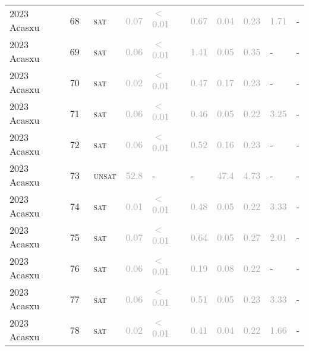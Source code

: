 \begin{center}
{\begin{longtable}{@{}llllllllll@{}}
2023 Acasxu & 68 & ~\textsc{sat} & \textcolor{darkgray}{0.07} & \textcolor{darkgray}{$<$0.01} & \textcolor{darkgray}{0.67} & \textcolor{darkgray}{0.04} & \textcolor{darkgray}{0.23} & \textcolor{darkgray}{1.71} & - \\
2023 Acasxu & 69 & ~\textsc{sat} & \textcolor{darkgray}{0.06} & \textcolor{darkgray}{$<$0.01} & \textcolor{darkgray}{1.41} & \textcolor{darkgray}{0.05} & \textcolor{darkgray}{0.35} & - & - \\
2023 Acasxu & 70 & ~\textsc{sat} & \textcolor{darkgray}{0.02} & \textcolor{darkgray}{$<$0.01} & \textcolor{darkgray}{0.47} & \textcolor{darkgray}{0.17} & \textcolor{darkgray}{0.23} & - & - \\
2023 Acasxu & 71 & ~\textsc{sat} & \textcolor{darkgray}{0.06} & \textcolor{darkgray}{$<$0.01} & \textcolor{darkgray}{0.46} & \textcolor{darkgray}{0.05} & \textcolor{darkgray}{0.22} & \textcolor{darkgray}{3.25} & - \\
2023 Acasxu & 72 & ~\textsc{sat} & \textcolor{darkgray}{0.06} & \textcolor{darkgray}{$<$0.01} & \textcolor{darkgray}{0.52} & \textcolor{darkgray}{0.16} & \textcolor{darkgray}{0.23} & - & - \\
2023 Acasxu & 73 & ~\textsc{unsat} & \textcolor{darkgray}{52.8} & - & - & \textcolor{darkgray}{47.4} & \textcolor{darkgray}{4.73} & - & - \\
2023 Acasxu & 74 & ~\textsc{sat} & \textcolor{darkgray}{0.01} & \textcolor{darkgray}{$<$0.01} & \textcolor{darkgray}{0.48} & \textcolor{darkgray}{0.05} & \textcolor{darkgray}{0.22} & \textcolor{darkgray}{3.33} & - \\
2023 Acasxu & 75 & ~\textsc{sat} & \textcolor{darkgray}{0.07} & \textcolor{darkgray}{$<$0.01} & \textcolor{darkgray}{0.64} & \textcolor{darkgray}{0.05} & \textcolor{darkgray}{0.27} & \textcolor{darkgray}{2.01} & - \\
2023 Acasxu & 76 & ~\textsc{sat} & \textcolor{darkgray}{0.06} & \textcolor{darkgray}{$<$0.01} & \textcolor{darkgray}{0.19} & \textcolor{darkgray}{0.08} & \textcolor{darkgray}{0.22} & - & - \\
2023 Acasxu & 77 & ~\textsc{sat} & \textcolor{darkgray}{0.06} & \textcolor{darkgray}{$<$0.01} & \textcolor{darkgray}{0.51} & \textcolor{darkgray}{0.05} & \textcolor{darkgray}{0.23} & \textcolor{darkgray}{3.33} & - \\
2023 Acasxu & 78 & ~\textsc{sat} & \textcolor{darkgray}{0.02} & \textcolor{darkgray}{$<$0.01} & \textcolor{darkgray}{0.41} & \textcolor{darkgray}{0.04} & \textcolor{darkgray}{0.22} & \textcolor{darkgray}{1.66} & - \\

\end{longtable}}
\end{center}
